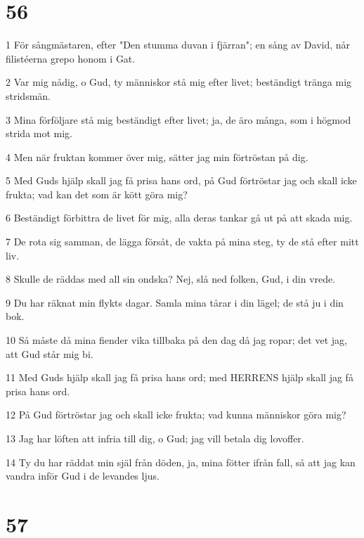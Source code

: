 \chapter{56}

\par 1 För sångmästaren, efter "Den stumma duvan i fjärran"; en sång av David, når filistéerna grepo honom i Gat.
\par 2 Var mig nådig, o Gud, ty människor stå mig efter livet; beständigt tränga mig stridsmän.
\par 3 Mina förföljare stå mig beständigt efter livet; ja, de äro många, som i högmod strida mot mig.
\par 4 Men när fruktan kommer över mig, sätter jag min förtröstan på dig.
\par 5 Med Guds hjälp skall jag få prisa hans ord, på Gud förtröstar jag och skall icke frukta; vad kan det som är kött göra mig?
\par 6 Beständigt förbittra de livet för mig, alla deras tankar gå ut på att skada mig.
\par 7 De rota sig samman, de lägga försåt, de vakta på mina steg, ty de stå efter mitt liv.
\par 8 Skulle de räddas med all sin ondska? Nej, slå ned folken, Gud, i din vrede.
\par 9 Du har räknat min flykts dagar. Samla mina tårar i din lägel; de stå ju i din bok.
\par 10 Så måste då mina fiender vika tillbaka på den dag då jag ropar; det vet jag, att Gud står mig bi.
\par 11 Med Guds hjälp skall jag få prisa hans ord; med HERRENS hjälp skall jag få prisa hans ord.
\par 12 På Gud förtröstar jag och skall icke frukta; vad kunna människor göra mig?
\par 13 Jag har löften att infria till dig, o Gud; jag vill betala dig lovoffer.
\par 14 Ty du har räddat min själ från döden, ja, mina fötter ifrån fall, så att jag kan vandra inför Gud i de levandes ljus.

\chapter{57}


